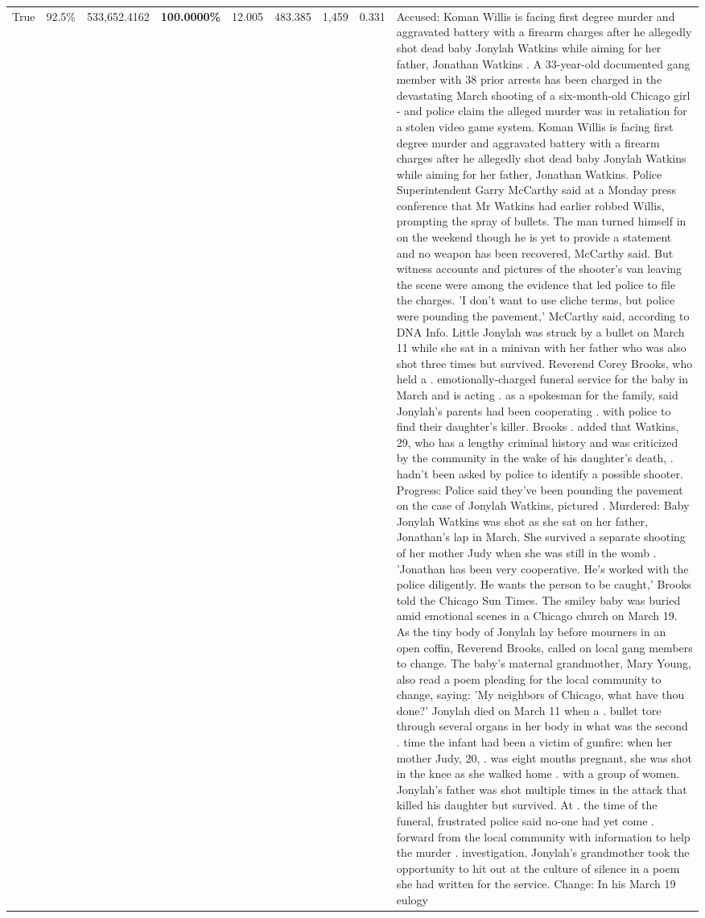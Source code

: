 \begin{table}[H]
\begin{tabular}{lllrlllll}
True & 92.5\% & 533,652.4162 & \bfseries \color{red} 100.0000\% & 12.005 & 483.385 & 1,459 & 0.331 & Accused: Koman Willis is facing first degree murder and aggravated battery with a firearm charges after he allegedly shot dead baby Jonylah Watkins while aiming for her father, Jonathan Watkins . A 33-year-old documented gang member with 38 prior arrests has been charged in the devastating March shooting of a six-month-old Chicago girl - and police claim the alleged murder was in retaliation for a stolen video game system. Koman Willis is facing first degree murder and aggravated battery with a firearm charges after he allegedly shot dead baby Jonylah Watkins while aiming for her father, Jonathan Watkins. Police Superintendent Garry McCarthy said at a Monday press conference that Mr Watkins had earlier robbed Willis, prompting the spray of bullets. The man turned himself in on the weekend though he is yet to provide a statement and no weapon has been recovered, McCarthy said. But witness accounts and pictures of the shooter's van leaving the scene were among the evidence that led police to file the charges. 'I don't want to use cliche terms, but police were pounding the pavement,' McCarthy said, according to DNA Info. Little Jonylah was struck by a bullet on March 11 while she sat in a minivan with her father who was also shot three times but survived. Reverend Corey Brooks, who held a . emotionally-charged funeral service for the baby in March and is acting . as a spokesman for the family, said Jonylah's parents had been cooperating . with police to find their daughter's killer. Brooks . added that Watkins, 29, who has a lengthy criminal history and was criticized by the community in the wake of his daughter's death, . hadn't been asked by police to identify a possible shooter. Progress: Police said they've been pounding the pavement on the case of Jonylah Watkins, pictured . Murdered: Baby Jonylah Watkins was shot as she sat on her father, Jonathan's lap in March. She survived a separate shooting of her mother Judy when she was still in the womb . 'Jonathan has been very cooperative. He's worked with the police diligently. He wants the person to be caught,' Brooks told the Chicago Sun Times. The smiley baby was buried amid emotional scenes in a Chicago church on March 19. As the tiny body of Jonylah lay before mourners in an open coffin, Reverend Brooks, called on local gang members to change. The baby's maternal grandmother, Mary Young, also read a poem pleading for the local community to change, saying: 'My neighbors of Chicago, what have thou done?' Jonylah died on March 11 when a . bullet tore through several organs in her body in what was the second . time the infant had been a victim of gunfire: when her mother Judy, 20, . was eight months pregnant, she was shot in the knee as she walked home . with a group of women. Jonylah's father was shot multiple times in the attack that killed his daughter but survived. At . the time of the funeral, frustrated police said no-one had yet come . forward from the local community with information to help the murder . investigation. Jonylah's grandmother took the opportunity to hit out at the culture of silence in a poem she had written for the service. Change: In his March 19 eulogy 
\end{tabular}
\end{table}
